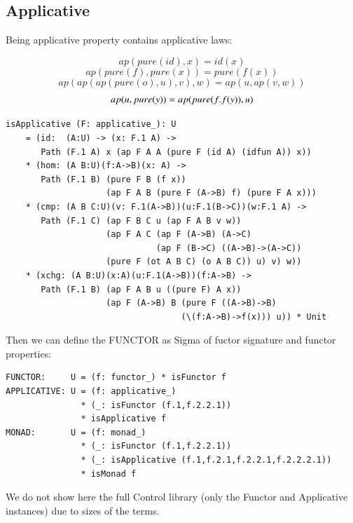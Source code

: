\documentclass{article}
\begin{document}
\newpage
\subsection*{Applicative}

Being applicative property contains applicative laws:

\begin{equation} ap(pure(id),x) = id(x) \end{equation}
\begin{equation} ap(pure(f),pure(x)) = pure(f(x)) \end{equation}
\begin{equation} ap(ap(ap(pure(o),u),v),w) = ap(u,ap(v,w)) \end{equation}
\begin{equation} ap(u,pure(y)) = ap(pure(\\f.f(y)),u) \end{equation}

\begin{lstlisting}[mathescape=true]
isApplicative (F: applicative_): U
    = (id:  (A:U) -> (x: F.1 A) ->
       Path (F.1 A) x (ap F A A (pure F (id A) (idfun A)) x))
    * (hom: (A B:U)(f:A->B)(x: A) ->
       Path (F.1 B) (pure F B (f x))
                    (ap F A B (pure F (A->B) f) (pure F A x)))
    * (cmp: (A B C:U)(v: F.1(A->B))(u:F.1(B->C))(w:F.1 A) ->
       Path (F.1 C) (ap F B C u (ap F A B v w))
                    (ap F A C (ap F (A->B) (A->C)
                              (ap F (B->C) ((A->B)->(A->C))
                    (pure F (ot A B C) (o A B C)) u) v) w))
    * (xchg: (A B:U)(x:A)(u:F.1(A->B))(f:A->B) ->
       Path (F.1 B) (ap F A B u ((pure F) A x))
                    (ap F (A->B) B (pure F ((A->B)->B)
                                   (\(f:A->B)->f(x))) u)) * Unit
\end{lstlisting}

Then we can define the FUNCTOR as Sigma of fuctor signature and functor properties:

\begin{lstlisting}[mathescape=true]
FUNCTOR:     U = (f: functor_) * isFunctor f
APPLICATIVE: U = (f: applicative_)
               * (_: isFunctor (f.1,f.2.2.1))
               * isApplicative f
MONAD:       U = (f: monad_)
               * (_: isFunctor (f.1,f.2.2.1))
               * (_: isApplicative (f.1,f.2.1,f.2.2.1,f.2.2.2.1))
               * isMonad f
\end{lstlisting}

We do not show here the full Control library (only the Functor and Applicative instances)
due to sizes of the terms.
\end{document}
